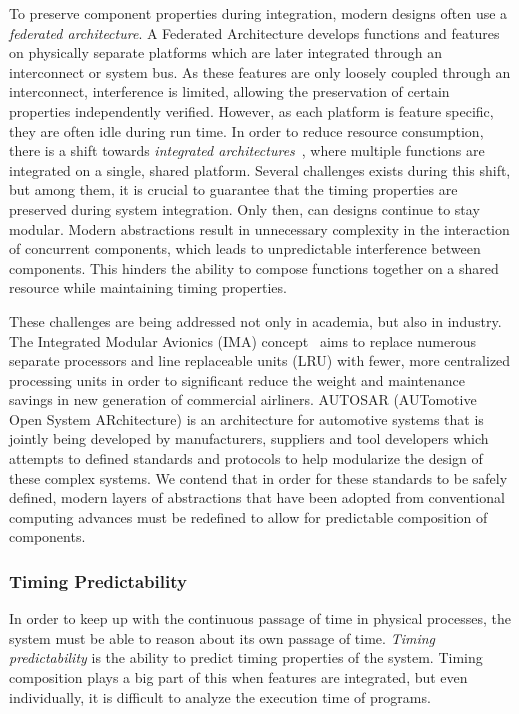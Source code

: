 To preserve component properties during integration, modern designs often use a \textit{federated architecture}.
A Federated Architecture develops functions and features on physically separate platforms which are later integrated through an interconnect or system bus. 
As these features are only loosely coupled through an interconnect, interference is limited, allowing the preservation of certain properties independently verified. 
However, as each platform is feature specific, they are often idle during run time.
In order to reduce resource consumption, there is a shift towards \textit{integrated architectures}~\cite{Obermaisser2009FedtoIMA,AvionicsWatkins2007IMA}, where multiple functions are integrated on a single, shared platform.
Several challenges exists during this shift, but among them, it is crucial to guarantee that the timing properties are preserved during system integration.
Only then, can designs continue to stay modular. 
Modern abstractions result in unnecessary complexity in the interaction of concurrent components, which leads to unpredictable interference between components. 
This hinders the ability to compose functions together on a shared resource while maintaining timing properties. 

These challenges are being addressed not only in academia, but also in industry.  
The Integrated Modular Avionics (IMA) concept~ aims to replace numerous separate processors and line replaceable units (LRU) with fewer, more centralized processing units in order to significant reduce the weight and maintenance savings in new generation of commercial airliners.
AUTOSAR (AUTomotive Open System ARchitecture)\cite{autosarsite} is an architecture for automotive systems that is jointly being developed by manufacturers, suppliers and tool developers which attempts to defined standards and protocols to help modularize the design of these complex systems.
We contend that in order for these standards to be safely defined, modern layers of abstractions that have been adopted from conventional computing advances must be redefined to allow for  predictable composition of components.  

\subsubsection{Timing Predictability}
In order to keep up with the continuous passage of time in physical processes, the system must be able to reason about its own passage of time.
\textit{Timing predictability} is the ability to predict timing properties of the system.
Timing composition plays a big part of this when features are integrated, but even individually, it is difficult to analyze the execution time of programs.

